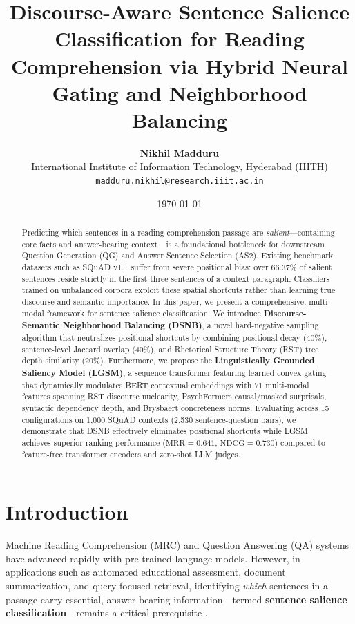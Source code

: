 \documentclass[11pt,a4paper,twocolumn]{article}
\title{\Large\bf Discourse-Aware Sentence Salience Classification for Reading Comprehension via Hybrid Neural Gating and Neighborhood Balancing}
\author{
  \textbf{Nikhil Madduru} \\
  International Institute of Information Technology, Hyderabad (IIITH) \\
  \texttt{madduru.nikhil@research.iiit.ac.in}
}
\date{\today}
\begin{document}
\maketitle

\begin{abstract}
Predicting which sentences in a reading comprehension passage are \textit{salient}---containing core facts and answer-bearing context---is a foundational bottleneck for downstream Question Generation (QG) and Answer Sentence Selection (AS2). Existing benchmark datasets such as SQuAD v1.1 suffer from severe positional bias: over $66.37\%$ of salient sentences reside strictly in the first three sentences of a context paragraph. Classifiers trained on unbalanced corpora exploit these spatial shortcuts rather than learning true discourse and semantic importance. In this paper, we present a comprehensive, multi-modal framework for sentence salience classification. We introduce \textbf{Discourse-Semantic Neighborhood Balancing (DSNB)}, a novel hard-negative sampling algorithm that neutralizes positional shortcuts by combining positional decay ($40\%$), sentence-level Jaccard overlap ($40\%$), and Rhetorical Structure Theory (RST) tree depth similarity ($20\%$). Furthermore, we propose the \textbf{Linguistically Grounded Saliency Model (LGSM)}, a sequence transformer featuring learned convex gating that dynamically modulates BERT contextual embeddings with 71 multi-modal features spanning RST discourse nuclearity, PsychFormers causal/masked surprisals, syntactic dependency depth, and Brysbaert concreteness norms. Evaluating across 15 configurations on 1,000 SQuAD contexts (2,530 sentence-question pairs), we demonstrate that DSNB effectively eliminates positional shortcuts while LGSM achieves superior ranking performance ($\text{MRR}=0.641$, $\text{NDCG}=0.730$) compared to feature-free transformer encoders and zero-shot LLM judges.
\end{abstract}

\section{Introduction}
Machine Reading Comprehension (MRC) and Question Answering (QA) systems have advanced rapidly with pre-trained language models. However, in applications such as automated educational assessment, document summarization, and query-focused retrieval, identifying \textit{which} sentences in a passage carry essential, answer-bearing information---termed \textbf{sentence salience classification}---remains a critical prerequisite \cite{du2017learning}. 
\end{document}
